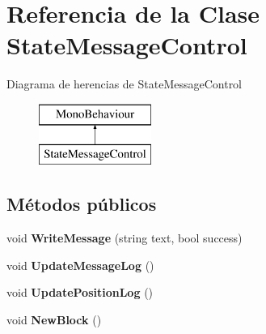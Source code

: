 \hypertarget{class_state_message_control}{}\section{Referencia de la Clase State\+Message\+Control}
\label{class_state_message_control}
Diagrama de herencias de State\+Message\+Control\begin{figure}[H]
\begin{center}
\leavevmode
\includegraphics[height=2.000000cm]{class_state_message_control}
\end{center}
\end{figure}
\subsection*{Métodos públicos}
\begin{DoxyCompactItemize}
\item 
\mbox{\label{class_state_message_control_a0b0830fc3f8fe9d578fce4b3d944cde6}} 
void {\bfseries Write\+Message} (string text, bool success)
\item 
\mbox{\label{class_state_message_control_af56933aa9a5a8d7d2c1e5fd515ec65e8}} 
void {\bfseries Update\+Message\+Log} ()
\item 
\mbox{\label{class_state_message_control_aeace074591852cb0cc7125520bc49817}} 
void {\bfseries Update\+Position\+Log} ()
\item 
\mbox{\label{class_state_message_control_a534610a9734b552696484aaeeb83c8b7}} 
void {\bfseries New\+Block} ()
\end{DoxyCompactItemize}
